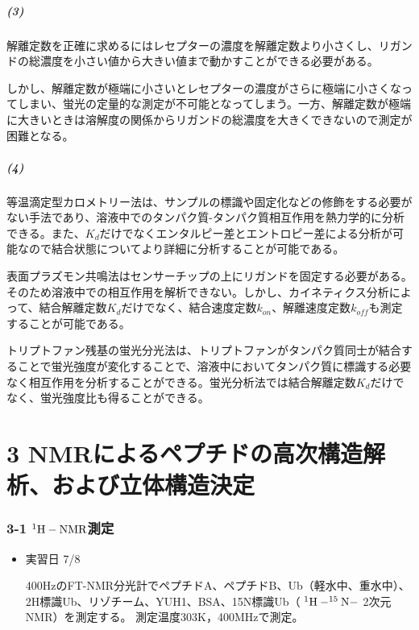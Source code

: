 \documentclass[a4paper,papersize,dvipdfmx]{jsarticle}
\begin{document}
\subsubsection*{(3)}
解離定数を正確に求めるにはレセプターの濃度を解離定数より小さくし、リガンドの総濃度を小さい値から大きい値まで動かすことができる必要がある。

しかし、解離定数が極端に小さいとレセプターの濃度がさらに極端に小さくなってしまい、蛍光の定量的な測定が不可能となってしまう。一方、解離定数が極端に大きいときは溶解度の関係からリガンドの総濃度を大きくできないので測定が困難となる。

\subsubsection*{(4)}
等温滴定型カロメトリー法は、サンプルの標識や固定化などの修飾をする必要がない手法であり、溶液中でのタンパク質-タンパク質相互作用を熱力学的に分析できる。また、$K_d$だけでなくエンタルピー差とエントロピー差による分析が可能なので結合状態についてより詳細に分析することが可能である。

表面プラズモン共鳴法はセンサーチップの上にリガンドを固定する必要がある。そのため溶液中での相互作用を解析できない。しかし、カイネティクス分析によって、結合解離定数$K_d$だけでなく、結合速度定数$k_{on}$、解離速度定数$k_{off}$も測定することが可能である。

トリプトファン残基の蛍光分光法は、トリプトファンがタンパク質同士が結合することで蛍光強度が変化することで、溶液中においてタンパク質に標識する必要なく相互作用を分析することができる。蛍光分析法では結合解離定数$K_d$だけでなく、蛍光強度比も得ることができる。

\part*{3 NMRによるペプチドの高次構造解析、および立体構造決定}

\section*{3-1 $\rm ^1 H-NMR$測定}

\begin{itemize}
\item 実習日 7/8

400HzのFT-NMR分光計でペプチドA、ペプチドB、Ub（軽水中、重水中）、2H標識Ub、リゾチーム、YUH1、BSA、15N標識Ub（ $\rm ^1H-^{15}N-$ 2次元NMR）を測定する。
測定温度303K，400MHzで測定。

\end{itemize}
\end{document}
